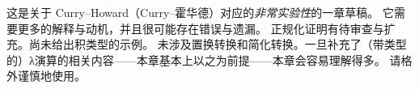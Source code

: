 \documentclass[../../../include/open-logic-chapter]{subfiles}
\begin{document}

\begin{editorial}
  这是关于 Curry--Howard（Curry–霍华德）对应的\emph{非常实验性}的一章草稿。
  它需要更多的解释与动机，并且很可能存在错误与遗漏。
  正规化证明有待审查与扩充。尚未给出积类型的示例。
  未涉及置换转换和简化转换。一旦补充了（带类型的）λ演算的相关内容——本章基本上以之为前提——本章会容易理解得多。
  请格外谨慎地使用。
\end{editorial}


\OLEndChapterHook
\end{document}
